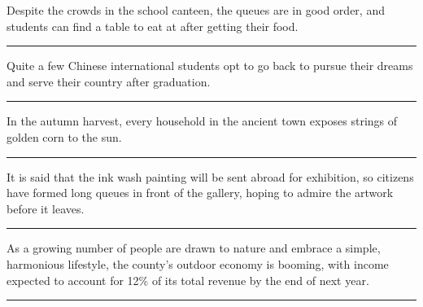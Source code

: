 \documentclass[11pt,a4paper]{article}
\newcommand{\num}[1]{\makebox[1.9em][r]{#1.}\hspace{0.3em}}
\newcommand{\wline}{\noindent\rule{\linewidth}{0.4pt}}
\begin{document}
\begin{minipage}{\linewidth}

\num{4}Despite the crowds in the school canteen, the queues are in good order, and students can find a table to eat at after getting their food.

\vspace{0.25em}

\wline

\end{minipage}

\vspace{0.35em}\vspace{0.15em}

\begin{minipage}{\linewidth}

\num{5}Quite a few Chinese international students opt to go back to pursue their dreams and serve their country after graduation.

\vspace{0.25em}

\wline

\end{minipage}

\begin{minipage}{\linewidth}

\num{6}In the autumn harvest, every household in the ancient town exposes strings of golden corn to the sun.

\vspace{0.25em}

\wline

\end{minipage}

\begin{minipage}{\linewidth}

\num{7}It is said that the ink wash painting will be sent abroad for exhibition, so citizens have formed long queues in front of the gallery, hoping to admire the artwork before it leaves.

\vspace{0.25em}

\wline

\end{minipage}

\begin{minipage}{\linewidth}

\num{8}As a growing number of people are drawn to nature and embrace a simple, harmonious lifestyle, the county’s outdoor economy is booming, with income expected to account for 12\% of its total revenue by the end of next year.

\vspace{0.25em}

\wline

\end{minipage}
\end{document}

